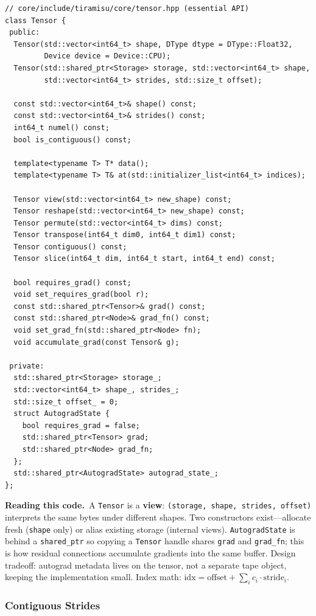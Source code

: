 \documentclass[11pt,a4paper]{article}
\newcommand{\explain}{\par\smallskip\noindent}
\newcommand{\exhead}{\textbf{Reading this code.}\ }
\begin{document}
\begin{lstlisting}[style=cpp]
// core/include/tiramisu/core/tensor.hpp (essential API)
class Tensor {
 public:
  Tensor(std::vector<int64_t> shape, DType dtype = DType::Float32,
         Device device = Device::CPU);
  Tensor(std::shared_ptr<Storage> storage, std::vector<int64_t> shape,
         std::vector<int64_t> strides, std::size_t offset);

  const std::vector<int64_t>& shape() const;
  const std::vector<int64_t>& strides() const;
  int64_t numel() const;
  bool is_contiguous() const;

  template<typename T> T* data();
  template<typename T> T& at(std::initializer_list<int64_t> indices);

  Tensor view(std::vector<int64_t> new_shape) const;
  Tensor reshape(std::vector<int64_t> new_shape) const;
  Tensor permute(std::vector<int64_t> dims) const;
  Tensor transpose(int64_t dim0, int64_t dim1) const;
  Tensor contiguous() const;
  Tensor slice(int64_t dim, int64_t start, int64_t end) const;

  bool requires_grad() const;
  void set_requires_grad(bool r);
  const std::shared_ptr<Tensor>& grad() const;
  const std::shared_ptr<Node>& grad_fn() const;
  void set_grad_fn(std::shared_ptr<Node> fn);
  void accumulate_grad(const Tensor& g);

 private:
  std::shared_ptr<Storage> storage_;
  std::vector<int64_t> shape_, strides_;
  std::size_t offset_ = 0;
  struct AutogradState {
    bool requires_grad = false;
    std::shared_ptr<Tensor> grad;
    std::shared_ptr<Node> grad_fn;
  };
  std::shared_ptr<AutogradState> autograd_state_;
};
\end{lstlisting}
\explain\exhead A \texttt{Tensor} is a \textbf{view}: \texttt{(storage, shape, strides, offset)}
interprets the same bytes under different shapes. Two constructors exist---allocate fresh
(\texttt{shape} only) or alias existing storage (internal views). \texttt{AutogradState} is
behind a \texttt{shared\_ptr} so copying a \texttt{Tensor} handle shares \texttt{grad} and
\texttt{grad\_fn}; this is how residual connections accumulate gradients into the same buffer.
Design tradeoff: autograd metadata lives on the tensor, not a separate tape object, keeping
the implementation small. Index math:
$\text{idx} = \text{offset} + \sum_i c_i \cdot \text{stride}_i$.

\subsubsection{Contiguous Strides}
\end{document}
